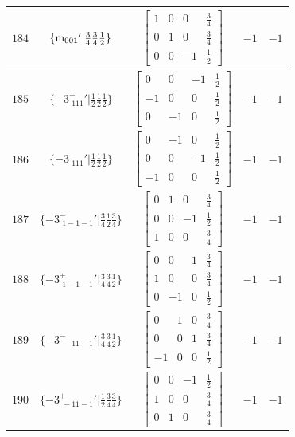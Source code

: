 \documentclass[fleqn,8pt]{jsarticle}
\begin{document}
\begin{longtable}{ccccc}
$ 184 $ & $ \{{\rm m}_{001}{}'|\frac{3}{4} \frac{3}{4} \frac{1}{2}\} $ & $ \begin{bmatrix} 1 & 0 & 0 & \frac{3}{4} \\ 0 & 1 & 0 & \frac{3}{4} \\ 0 & 0 & -1 & \frac{1}{2} \end{bmatrix} $ & $ -1 $ & $ -1 $ \\ \hline
$ 185 $ & $ \{-3^{+}_{\,\,111}{}'|\frac{1}{2} \frac{1}{2} \frac{1}{2}\} $ & $ \begin{bmatrix} 0 & 0 & -1 & \frac{1}{2} \\ -1 & 0 & 0 & \frac{1}{2} \\ 0 & -1 & 0 & \frac{1}{2} \end{bmatrix} $ & $ -1 $ & $ -1 $ \\ \hline
$ 186 $ & $ \{-3^{-}_{\,\,111}{}'|\frac{1}{2} \frac{1}{2} \frac{1}{2}\} $ & $ \begin{bmatrix} 0 & -1 & 0 & \frac{1}{2} \\ 0 & 0 & -1 & \frac{1}{2} \\ -1 & 0 & 0 & \frac{1}{2} \end{bmatrix} $ & $ -1 $ & $ -1 $ \\ \hline
$ 187 $ & $ \{-3^{-}_{\,\,1-1-1}{}'|\frac{3}{4} \frac{1}{2} \frac{3}{4}\} $ & $ \begin{bmatrix} 0 & 1 & 0 & \frac{3}{4} \\ 0 & 0 & -1 & \frac{1}{2} \\ 1 & 0 & 0 & \frac{3}{4} \end{bmatrix} $ & $ -1 $ & $ -1 $ \\ \hline
$ 188 $ & $ \{-3^{+}_{\,\,1-1-1}{}'|\frac{3}{4} \frac{3}{4} \frac{1}{2}\} $ & $ \begin{bmatrix} 0 & 0 & 1 & \frac{3}{4} \\ 1 & 0 & 0 & \frac{3}{4} \\ 0 & -1 & 0 & \frac{1}{2} \end{bmatrix} $ & $ -1 $ & $ -1 $ \\ \hline
$ 189 $ & $ \{-3^{-}_{\,\,-11-1}{}'|\frac{3}{4} \frac{3}{4} \frac{1}{2}\} $ & $ \begin{bmatrix} 0 & 1 & 0 & \frac{3}{4} \\ 0 & 0 & 1 & \frac{3}{4} \\ -1 & 0 & 0 & \frac{1}{2} \end{bmatrix} $ & $ -1 $ & $ -1 $ \\ \hline
$ 190 $ & $ \{-3^{+}_{\,\,-11-1}{}'|\frac{1}{2} \frac{3}{4} \frac{3}{4}\} $ & $ \begin{bmatrix} 0 & 0 & -1 & \frac{1}{2} \\ 1 & 0 & 0 & \frac{3}{4} \\ 0 & 1 & 0 & \frac{3}{4} \end{bmatrix} $ & $ -1 $ & $ -1 $ \\ \hline

\end{longtable}
\end{document}
